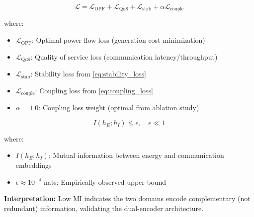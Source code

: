 \begin{equation}
\label{eq:total_loss}
\mathcal{L} = \mathcal{L}_{\text{OPF}} + \mathcal{L}_{\text{QoS}} + \mathcal{L}_{\text{stab}} + \alpha \mathcal{L}_{\text{couple}}
\end{equation}

\noindent where:
\begin{itemize}
    \item $\mathcal{L}_{\text{OPF}}$: Optimal power flow loss (generation cost minimization)
    \item $\mathcal{L}_{\text{QoS}}$: Quality of service loss (communication latency/throughput)
    \item $\mathcal{L}_{\text{stab}}$: Stability loss from \eqref{eq:stability_loss}
    \item $\mathcal{L}_{\text{couple}}$: Coupling loss from \eqref{eq:coupling_loss}
    \item $\alpha = 1.0$: Coupling loss weight (optimal from ablation study)
\end{itemize}




\begin{equation}
\label{eq:mutual_info}
I(h_E; h_I) \leq \epsilon, \quad \epsilon \ll 1
\end{equation}

\noindent where:
\begin{itemize}
    \item $I(h_E; h_I)$: Mutual information between energy and communication embeddings
    \item $\epsilon \approx 10^{-4}$ nats: Empirically observed upper bound
\end{itemize}

\textbf{Interpretation:} Low MI indicates the two domains encode complementary (not redundant) information, validating the dual-encoder architecture.


